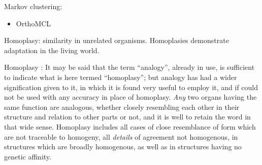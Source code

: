 Markov clustering:

\begin{itemize}
	\item OrthoMCL
\end{itemize}

Homoplasy: similarity in unrelated organisms. Homoplasies demonstrate adaptation
in the living world.

Homoplasy \citep{lankester1870}: It may be said that the term ``analogy'',
already in use, is sufficient to indicate what is here termed ``homoplasy''; but
analogy has had a wider signification given to it, in which it is found very
useful to employ it, and if could not be used with any accuracy in place of
homoplasy.  \emph{Any} two organs having the same function are analogous,
whether closely resembling each other in their structure and relation to other
parts or not, and it is well to retain the word in that wide sense. Homoplasy
includes all cases of close resemblance of form which are not traceable to
homogeny, all \emph{details} of agreement not homogenous, in structures which
are broadly homogenous, as well as in structures having no genetic affinity.
